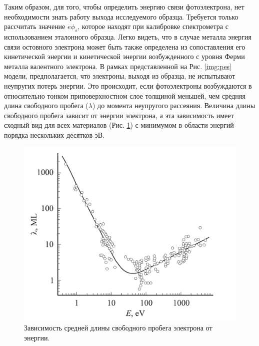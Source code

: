 Таким образом, для того, чтобы определить энергию связи фотоэлектрона, нет необходимости знать работу выхода исследуемого образца. Требуется только рассчитать значение $e\phi_s$, которое находят при калибровке спектрометра с использованием эталонного образца. Легко видеть, что в случае металла энергия связи остовного электрона может быть также определена из сопоставления его кинетической энергии и кинетической энергии возбужденного с уровня Ферми металла валентного электрона. 
В рамках представленной на Рис. \ref{img:pes} модели, предполагается, что электроны, выходя из образца, не испытывают неупругих потерь энергии. Это происходит, если фотоэлектроны возбуждаются в относительно тонком приповерхностном слое толщиной меньшей, чем средняя длина свободного пробега ($\lambda$) до момента неупругого рассеяния. Величина длины свободного пробега зависит от энергии электрона, а эта зависимость имеет сходный вид для всех материалов (Рис. \ref{img:pes2}) с минимумом в области энергий порядка нескольких десятков эВ.
 \begin{figure}[ht] 
  \center
  \includegraphics [scale=0.67] {./Dissertation/images/pes2.png}
  \caption{Зависимость средней длины свободного пробега электрона от энергии.} 
  \label{img:pes2}  
\end{figure}
 

